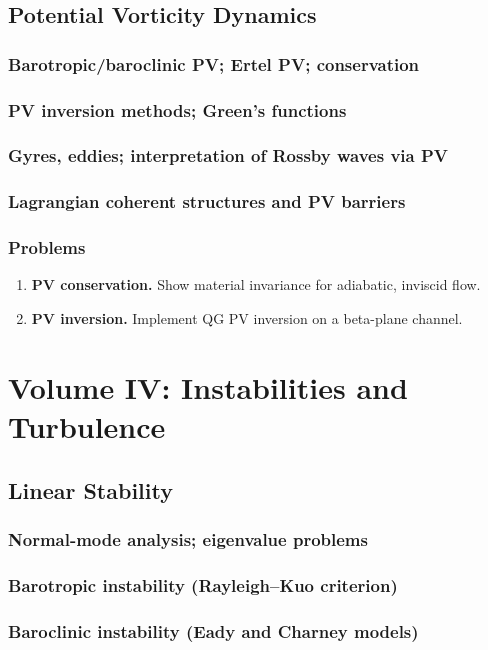 \documentclass[12pt]{book}
\begin{document}
\chapter{Potential Vorticity Dynamics}
\section{Barotropic/baroclinic PV; Ertel PV; conservation}
\section{PV inversion methods; Green’s functions}
\section{Gyres, eddies; interpretation of Rossby waves via PV}
\section{Lagrangian coherent structures and PV barriers}
\section*{Problems}
\begin{enumerate}
  \item \textbf{PV conservation.} Show material invariance for adiabatic, inviscid flow.
  \item \textbf{PV inversion.} Implement QG PV inversion on a beta-plane channel.
\end{enumerate}

\part{Volume IV: Instabilities and Turbulence}

\chapter{Linear Stability}
\section{Normal-mode analysis; eigenvalue problems}
\section{Barotropic instability (Rayleigh--Kuo criterion)}
\section{Baroclinic instability (Eady and Charney models)}
\end{document}
